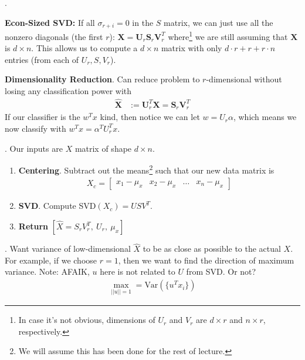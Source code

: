 \documentclass[12pt]{article}
\newcommand{\myspace}{\vspace{2\bigskipamount}}
\newcommand\p{\Needspace{10\baselineskip} \noindent}
\begin{document}
\p {}. 
\begin{compactitem}
	\item \textbf{Econ-Sized SVD:} If all $\sigma_{r + i} = 0$ in the $S$ matrix, we can just use all the nonzero diagonals (the first $r$): $\mathbf X = \mathbf U_r \mathbf S_r \mathbf V_r^T$ where\footnote{In case it's not obvious, dimensions of $U_r$ and $V_r$ are $d \times r$ and $n \times r$, respectively.} we are still assuming that $\mathbf X$ is $d \times n$. This allows us to compute a $d \times n$ matrix with only $d \cdot r + r + r\cdot n$ entries (from each of $U_r, S, V_r$). 
	
	\item \textbf{Dimensionality Reduction}. Can reduce problem to $r$-dimensional without losing any classification power with
	\begin{align}
		\hat{\mathbf X} &:= \mathbf{U}_r^T \mathbf{X} = \mathbf{S}_r \mathbf{V}_r^T
	\end{align}
	If our classifier is the $w^T x$ kind, then notice we can let $w = U_r \alpha$, which means we now classify with $w^T x = \alpha^T U_r^T x$. 
\end{compactitem}


\myspace 
\p {}. Our inputs are $X$ matrix of shape $d \times n$. 
\begin{enumerate}
	\item \textbf{Centering}. Subtract out the means\footnote{We will assume this has been done for the rest of lecture.} such that our new data matrix is
	\begin{align}
		X_c = \begin{bmatrix}x_1 - \mu_x & x_2 - \mu_x & \ldots & x_n - \mu_x \end{bmatrix}
	\end{align}
	
	\item \textbf{SVD}. Compute SVD$(X_c) = U S V^T$. 
	
	\item \textbf{Return} $[ \hat X = S_r V_r^T, ~ U_r, ~ \mu_x ]$
\end{enumerate}

\myspace
\p {}. Want variance of low-dimensional $\hat X$ to be as close as possible to the actual $X$. For example, if we choose $r = 1$, then we want to find the direction of maximum variance. Note: AFAIK, $u$ here is not related to $U$ from SVD. Or not?
\begin{align}
\max_{||u|| = 1}  = \text{Var}(\{u^T x_i \})
\end{align}
\end{document}
